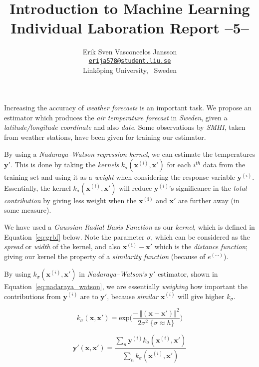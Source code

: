 \documentclass[a4paper, twocolumn]{article}
\title{Introduction to Machine Learning \\
       Individual Laboration Report --5--}
\author{{Erik Sven Vasconcelos Jansson} \\
        {\href{mailto:erija578@student.liu.se}
        {\texttt{erija578@student.liu.se}}} \\
        {Linköping University, \, Sweden}}
\begin{document}
    \maketitle %

    Increasing the accuracy of \emph{weather forecasts} is an important task. We propose an estimator which produces the \emph{air temperature forecast} in \emph{Sweden}, given a \emph{latitude/longitude coordinate} and also \emph{date}. Some observations by \emph{SMHI}, taken from weather stations, have been given for training our estimator.

    By using a \emph{Nadaraya–Watson regression kernel}, we can estimate the temperatures \(\bm{y'}\). This is done by taking the \emph{kernels} \(k_\sigma(\bm{x}^{(i)}, \bm{x'})\) for each \(i^{th}\) data from the training set and using it as a \emph{weight} when considering the response variable \(\bm{y}^{(i)}\). Essentially, the kernel \(k_\sigma(\bm{x}^{(i)}, \bm{x'})\) will reduce \(\bm{y}^{(i)}\)'s significance in the \emph{total contribution} by giving less weight when the \(\bm{x^{(i)}}\) and \(\bm{x'}\) are further away (in some measure).

    We have used a \emph{Gaussian Radial Basis Function} as our \emph{kernel}, which is defined in Equation~\ref{eq:grbf} below. Note the parameter \(\sigma\), which can be considered as the \emph{spread} or \emph{width} of the kernel, and also \(\bm{x^{(i)}} - \bm{x'}\) which is the \emph{distance function}; giving our kernel the property of a \emph{similarity function} (because of \(e^{(\cdots)}\)).

    By using \(k_\sigma(\bm{x}^{(i)}, \bm{x'})\) in \emph{Nadaraya–Watson's} \(\bm{y'}\) estimator, shown in Equation~\ref{eq:nadaraya_watson}, we are essentially \emph{weighing} how important the contributions from \(\bm{y}^{(i)}\) are to \(\bm{y'}\), because \emph{similar} \(\bm{x}^{(i)}\) will give higher \(k_\sigma\).

    \begin{equation} \label{eq:grbf}
        k_\sigma(\bm{x}, \bm{x'}) = \mathrm{exp}\bigg(\frac{- \, {\left\Vert(\bm{x} - \bm{x'}) \right\Vert}^2}
                                                           {2\sigma^2 \; \{\sigma \approx h\}}\bigg)
    \end{equation}

    \begin{equation} \label{eq:nadaraya_watson}
        \bm{y'}(\bm{x}, \bm{x'}) = \frac{\sum_n{\bm{y}^{(i)}k_\sigma(\bm{x}^{(i)}, \bm{x'})}}
                                               {\sum_n{k_\sigma(\bm{x}^{(i)}, \bm{x'})}}
    \end{equation}
\end{document}

